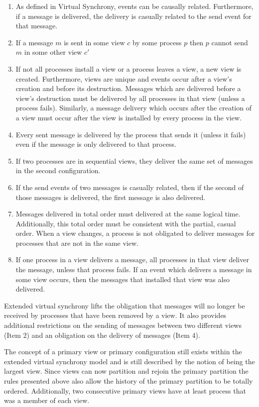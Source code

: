 \begin{enumerate}
	\item As defined in Virtual Synchrony, events can be causally related.
		Furthermore, if a message is delivered, the delivery is casually
		related to the send event for that message. 
	\item If a message $m$ is sent in some view $c$ by some process $p$ then $p$
		cannot send $m$ in some other view $c'$
	\item If not all processes install a view or a process leaves a view, a new
		view is created. Furthermore, views are unique and events occur after a
		view's creation and before its destruction. Messages which are delivered
		before a view's destruction must be delivered by all processes in that
		view (unless a process fails). Similarly, a message delivery which occurs
		after the creation of a view must occur after the view is installed by
		every process in the view.
	\item Every sent message is delivered by the process that sends it (unless it
		fails) even if the message is only delivered to that process.
	\item If two processes are in sequential views, they deliver the same set of
		messages in the second configuration.
	\item If the send events of two messages is casually related, then if the
		second of those messages is delivered, the first message is also delivered.
	\item Messages delivered in total order must delivered at the same logical time.
		Additionally, this total order must be consistent with the partial, casual
		order. When a view changes, a process is not obligated to deliver messages
		for processes that are not in the same view.
	\item If one process in a view delivers a message, all processes in that view
		deliver the message, unless that process fails. If an event which delivers
		a message in some view occurs, then the messages that installed that view
		was also delivered.
\end{enumerate} \cite{EXTENDEDVIRTUALSYNCHRONY}

Extended virtual synchrony lifts the obligation that messages will no longer be
received by processes that have been removed by a view. It also provides
additional restrictions on the sending of messages between two different views
(Item 2) and an obligation on the delivery of messages (Item 4). 

The concept of a primary view or primary configuration still exists within the
extended virtual synchrony model and is still described by the notion of being
the largest view. Since views can now partition and rejoin the primary partition
the rules presented above also allow the history of the primary partition to be
totally ordered. Additionally, two consecutive primary views have at least
process that was a member of each view.

